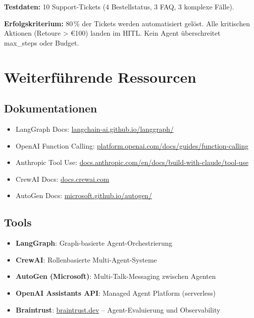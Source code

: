 \textbf{Testdaten:} 10 Support-Tickets (4 Bestellstatus, 3 FAQ, 3 komplexe Fälle).

\textbf{Erfolgskriterium:} 80\,\% der Tickets werden automatisiert gelöst. Alle kritischen Aktionen (Retoure > €100) landen im HITL. Kein Agent überschreitet max\_steps oder Budget.

\section{Weiterführende Ressourcen}

\subsection{Dokumentationen}

\begin{itemize}[leftmargin=*]
    \item LangGraph Docs: \href{https://langchain-ai.github.io/langgraph/}{langchain-ai.github.io/langgraph/}
    \item OpenAI Function Calling: \href{https://platform.openai.com/docs/guides/function-calling}{platform.openai.com/docs/guides/function-calling}
    \item Anthropic Tool Use: \href{https://docs.anthropic.com/en/docs/build-with-claude/tool-use}{docs.anthropic.com/en/docs/build-with-claude/tool-use}
    \item CrewAI Docs: \href{https://docs.crewai.com}{docs.crewai.com}
    \item AutoGen Docs: \href{https://microsoft.github.io/autogen/}{microsoft.github.io/autogen/}
\end{itemize}

\subsection{Tools}

\begin{itemize}[leftmargin=*]
    \item \textbf{LangGraph}: Graph-basierte Agent-Orchestrierung
    \item \textbf{CrewAI}: Rollenbasierte Multi-Agent-Systeme
    \item \textbf{AutoGen (Microsoft)}: Multi-Talk-Messaging zwischen Agenten
    \item \textbf{OpenAI Assistants API}: Managed Agent Platform (serverless)
    \item \textbf{Braintrust}: \href{https://www.braintrust.dev}{braintrust.dev} -- Agent-Evaluierung und Observability
\end{itemize}

